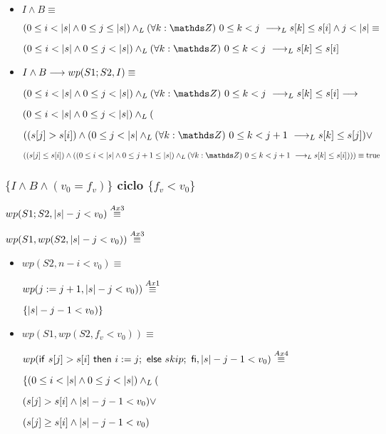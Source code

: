 \documentclass{article}
\begin{document}
\begin{itemize}
    \item $I \wedge B \equiv$
    
    $ (0 \leq i < \longitud{s} \wedge 0 \leq j \leq \longitud{s}) \yLuego \paraTodo{k}{0}{j} \implicaLuego s[k] \leq s[i] \wedge j < \longitud{s} \equiv$

    $(0 \leq i < \longitud{s} \wedge 0 \leq j < \longitud{s}) \yLuego \paraTodo{k}{0}{j} \implicaLuego s[k] \leq s[i]$

    \item $I \wedge B \longrightarrow wp(S1;S2, I) \equiv$

    $(0 \leq i < \longitud{s} \wedge 0 \leq j < \longitud{s}) \yLuego \paraTodo{k}{0}{j} \implicaLuego s[k] \leq s[i] \implica$

    $ (0 \leq i < |s| \wedge 0 \leq j < |s|) \land _L ($

    $ ((s[j] > s[i]) \wedge (0 \leq j < \longitud{s} \yLuego \paraTodo{k}{0}{j+1} \implicaLuego s[k] \leq s[j] ) \vee$

    $ ((s[j] \leq s[i]) \wedge ((0 \leq i < \longitud{s} \wedge 0 \leq j+1 \leq \longitud{s}) \yLuego \paraTodo{k}{0}{j+1} \implicaLuego s[k] \leq s[i]))) \equiv \True$
\end{itemize}

\subsubsection*{$\{I \wedge B \wedge (v_{0} = f_{v})\}$ ciclo $\{f_{v} < v_{0}\}$}

$wp(S1;S2, |s|-j<v_{0}) \stackrel{Ax3}{\equiv}$

$wp(S1, wp(S2, |s|-j<v_{0})) \stackrel{Ax3}{\equiv}$

\begin{itemize}
    \item $wp(S2, n-i<v_{0}) \equiv$
    
    $ wp(j:= j+1, |s|-j<v_{0})) \stackrel{Ax1}{\equiv}$

    $\{|s|-j-1<v_{0}) \}$

    \item $wp(S1, wp(S2, f_{v} < v_{0})) \equiv$

    $wp(\mathsf{if}\ s[j] > s[i]\ \mathsf{then}\ i:=j;\ \mathsf{else}\ skip;\ \mathsf{fi}, |s|-j-1<v_{0}) \stackrel{Ax4}{\equiv}$

    $\{ (0 \leq i < |s| \wedge 0 \leq j < |s|) \land _L ( $

    $ (s[j] > s[i] \wedge |s|-j-1<v_{0} ) \vee $

    $ (s[j] \geq s[i] \wedge |s|-j-1<v_{0} ) $

\end{itemize}
\end{document}
